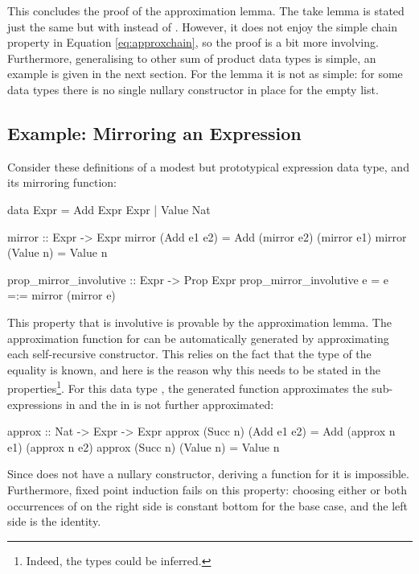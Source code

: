This concludes the proof of the approximation lemma. The take lemma is
stated just the same but with  instead of
. However, it does not enjoy the simple chain property in
Equation \ref{eq:approxchain}, so the proof is a bit more involving.
Furthermore, generalising  to other sum of product
data types is simple, an example is given in the next section. For the
 lemma it is not as simple: for some data types there is no
single nullary constructor in place for the empty list.

\subsection{Example: Mirroring an Expression}

Consider these definitions of a modest but prototypical expression
data type, and its mirroring function:

\begin{code}
data Expr = Add Expr Expr | Value Nat

mirror :: Expr -> Expr
mirror (Add e1 e2) = Add (mirror e2) (mirror e1)
mirror (Value n)   = Value n

prop_mirror_involutive :: Expr -> Prop Expr
prop_mirror_involutive e = e =:= mirror (mirror e)
\end{code}

This property that  is involutive is provable by the
approximation lemma. The approximation function for  can be
automatically generated by approximating each self-recursive
constructor. This relies on the fact that the type of the equality is
known, and here is the reason why this needs to be stated in the
properties\footnote{Indeed, the types could be inferred.}. For this
data type , the generated function approximates the
sub-expressions in  and the  in  is not
further approximated:

\begin{code}
approx :: Nat -> Expr -> Expr
approx (Succ n) (Add e1 e2) = Add (approx n e1) (approx n e2)
approx (Succ n) (Value n)   = Value n
\end{code}

Since  does not have a nullary constructor, deriving a
 function for it is impossible. Furthermore, fixed point
induction fails on this property: choosing either or both occurrences
of  on the right side is constant bottom for the base case,
and the left side is the identity.

